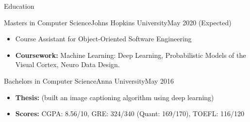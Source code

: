 \documentclass[]{mcdowellcv}
\begin{document}
	\makeheader
	

\begin{cvsection}{Education}
		\begin{cvsubsection}{Masters in Computer Science}{Johns Hopkins University}{May 2020 (Expected)}
			\begin{itemize}
				\item Course Assistant for Object-Oriented Software Engineering
				\item \textbf{Coursework:} Machine Learning: Deep Learning, Probabilistic Models of the Visual Cortex, Neuro Data Design.
			\end{itemize}
		\end{cvsubsection}
		\begin{cvsubsection}{Bachelors in Computer Science}{Anna University}{May 2016}
			\begin{itemize}
				\item \textbf{Thesis:} \href{https://github.com/tpsatish95/image-captioning}{\color{blue!70}{Automated Scenario Description for Images}} (built an image captioning algorithm using deep learning)
				\item \textbf{Scores:} CGPA: 8.56/10, GRE: 324/340 (Quant: 169/170), TOEFL: 116/120
			\end{itemize}
		\end{cvsubsection}
	\end{cvsection}
\end{document}
